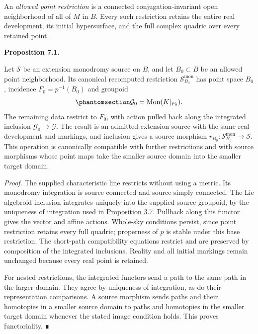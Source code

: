 \documentclass[
  english,
  11pt,
  reqno]{amsart}
\makeatletter
\newcommand{\pandocstatementheading}[1]{%
  \par\addpenalty{\@beginparpenalty}%
  \addvspace{.5\baselineskip plus .2\baselineskip minus .2\baselineskip}%
  {\normalfont\bfseries #1\par}%
  \nobreak\@afterindenttrue\@afterheading
}
\makeatother
\begin{document}
An \emph{allowed point restriction} is a connected conjugation-invariant
open neighborhood of all of \(M\) in \(B\). Every such restriction
retains the entire real development, its initial hypersurface, and the
full complex quadric over every retained point.

\pandocstatementheading{\protect{}\label{prop:recomputed-monodromy-restriction}Proposition 7.1.}

Let \(\mathcal S\) be an extension monodromy source on \(B\), and let
\(B_0\subset B\) be an allowed point neighborhood. Its canonical
recomputed restriction \(\mathcal S^{\mathrm{mon}}_{B_0}\) has point
space \(B_0\), incidence \(F_0=p^{-1}(B_0)\) and groupoid
\begin{equation}\protect\phantomsection\label{eq:recomputed-monodromy-restriction}{
\mathcal G_0=\operatorname{Mon}(K|_{F_0}).
}\end{equation} The remaining data restrict to \(F_0\), with action
pulled back along the integrated inclusion
\(\mathcal G_0\to\mathcal G\). The result is an admitted extension
source with the same real development and markings, and inclusion gives
a source morphism
\(r_{B_0}:\mathcal S^{\mathrm{mon}}_{B_0}\to\mathcal S\). This operation
is canonically compatible with further restrictions and with source
morphisms whose point maps take the smaller source domain into the
smaller target domain.

\emph{Proof.} The supplied characteristic line restricts without using a
metric. Its monodromy integration is source connected and source simply
connected. The Lie algebroid inclusion integrates uniquely into the
supplied source groupoid, by the uniqueness of integration used in
\hyperref[prop:holomorphic-null-monodromy]{Proposition 3.7}. Pullback
along this functor gives the vector and affine actions. Whole-sky
conditions persist, since point restriction retains every full quadric;
properness of \(p\) is stable under this base restriction. The
short-path compatibility equations restrict and are preserved by
composition of the integrated inclusions. Reality and all initial
markings remain unchanged because every real point is retained.

For nested restrictions, the integrated functors send a path to the same
path in the larger domain. They agree by uniqueness of integration, as
do their representation comparisons. A source morphism sends paths and
their homotopies in a smaller source domain to paths and homotopies in
the smaller target domain whenever the stated image condition holds.
This proves functoriality. ∎
\end{document}
